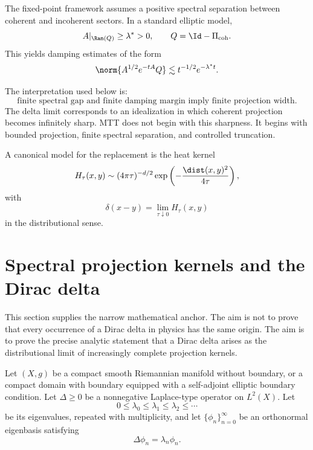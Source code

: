 \documentclass[11pt]{article}
\begin{document}
The fixed-point framework assumes a positive spectral separation between coherent and
incoherent sectors.  In a standard elliptic model,
\begin{equation}
A|_{\Ran(Q)}\geq \lambda^\ast>0,\qquad Q=\Id-\Pi_{\mathrm{coh}}.
\end{equation}
This yields damping estimates of the form
\begin{equation}
\norm{A^{1/2}e^{-tA}Q}\lesssim t^{-1/2}e^{-\lambda^\ast t}.
\end{equation}

The interpretation used below is:
\[
\boxed{\text{finite spectral gap and finite damping margin imply finite projection width.}}
\]
The delta limit corresponds to an idealization in which coherent projection becomes
infinitely sharp.  MTT does not begin with this sharpness.  It begins with bounded
projection, finite spectral separation, and controlled truncation.

A canonical model for the replacement is the heat kernel
\begin{equation}
H_\tau(x,y)\sim (4\pi \tau)^{-d/2}\exp\left(-\frac{\dist(x,y)^2}{4\tau}\right),
\end{equation}
with
\begin{equation}
\delta(x-y)=\lim_{\tau\downarrow 0}H_\tau(x,y)
\end{equation}
in the distributional sense.

\section{Spectral projection kernels and the Dirac delta}

This section supplies the narrow mathematical anchor.  The aim is not to prove that every
occurrence of a Dirac delta in physics has the same origin.  The aim is to prove the
precise analytic statement that a Dirac delta arises as the distributional limit of
increasingly complete projection kernels.

\begin{assumption}\label{ass:compact-elliptic}
Let \((X,g)\) be a compact smooth Riemannian manifold without boundary, or a compact
domain with boundary equipped with a self-adjoint elliptic boundary condition. Let
\(\Delta\geq 0\) be a nonnegative Laplace-type operator on \(L^2(X)\).  Let
\[
0\leq \lambda_0\leq \lambda_1\leq \lambda_2\leq \cdots
\]
be its eigenvalues, repeated with multiplicity, and let \(\{\phi_n\}_{n=0}^\infty\) be an
orthonormal eigenbasis satisfying
\begin{equation}
\Delta \phi_n=\lambda_n\phi_n .
\end{equation}
\end{assumption}
\end{document}
